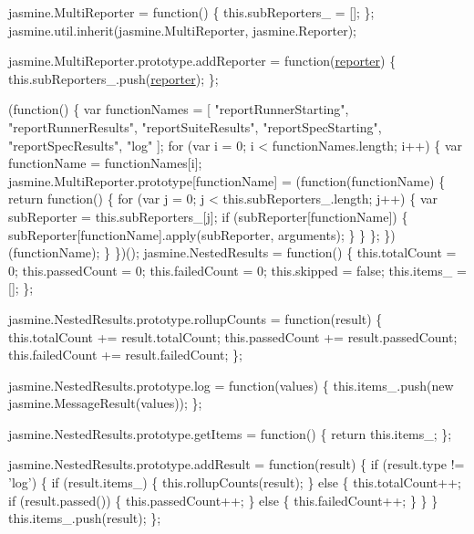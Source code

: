 \begin{DoxyCodeInclude}
jasmine.MultiReporter = \textcolor{keyword}{function}() \{
  this.subReporters\_ = [];
\};
jasmine.util.inherit(jasmine.MultiReporter, jasmine.Reporter);

jasmine.MultiReporter.prototype.addReporter = \textcolor{keyword}{function}(\hyperlink{classreporter}{reporter}) \{
  this.subReporters\_.push(\hyperlink{classreporter}{reporter});
\};

(\textcolor{keyword}{function}() \{
  var functionNames = [
    \textcolor{stringliteral}{"reportRunnerStarting"},
    \textcolor{stringliteral}{"reportRunnerResults"},
    \textcolor{stringliteral}{"reportSuiteResults"},
    \textcolor{stringliteral}{"reportSpecStarting"},
    \textcolor{stringliteral}{"reportSpecResults"},
    \textcolor{stringliteral}{"log"}
  ];
  \textcolor{keywordflow}{for} (var i = 0; i < functionNames.length; i++) \{
    var functionName = functionNames[i];
    jasmine.MultiReporter.prototype[functionName] = (\textcolor{keyword}{function}(functionName) \{
      \textcolor{keywordflow}{return} \textcolor{keyword}{function}() \{
        \textcolor{keywordflow}{for} (var j = 0; j < this.subReporters\_.length; j++) \{
          var subReporter = this.subReporters\_[j];
          \textcolor{keywordflow}{if} (subReporter[functionName]) \{
            subReporter[functionName].apply(subReporter, arguments);
          \}
        \}
      \};
    \})(functionName);
  \}
\})();
jasmine.NestedResults = \textcolor{keyword}{function}() \{
  this.totalCount = 0;
  this.passedCount = 0;
  this.failedCount = 0;
  this.skipped = \textcolor{keyword}{false};
  this.items\_ = [];
\};

jasmine.NestedResults.prototype.rollupCounts = \textcolor{keyword}{function}(result) \{
  this.totalCount += result.totalCount;
  this.passedCount += result.passedCount;
  this.failedCount += result.failedCount;
\};

jasmine.NestedResults.prototype.log = \textcolor{keyword}{function}(values) \{
  this.items\_.push(\textcolor{keyword}{new} jasmine.MessageResult(values));
\};

jasmine.NestedResults.prototype.getItems = \textcolor{keyword}{function}() \{
  \textcolor{keywordflow}{return} this.items\_;
\};

jasmine.NestedResults.prototype.addResult = \textcolor{keyword}{function}(result) \{
  \textcolor{keywordflow}{if} (result.type != \textcolor{stringliteral}{'log'}) \{
    \textcolor{keywordflow}{if} (result.items\_) \{
      this.rollupCounts(result);
    \} \textcolor{keywordflow}{else} \{
      this.totalCount++;
      \textcolor{keywordflow}{if} (result.passed()) \{
        this.passedCount++;
      \} \textcolor{keywordflow}{else} \{
        this.failedCount++;
      \}
    \}
  \}
  this.items\_.push(result);
\};


\end{DoxyCodeInclude}
